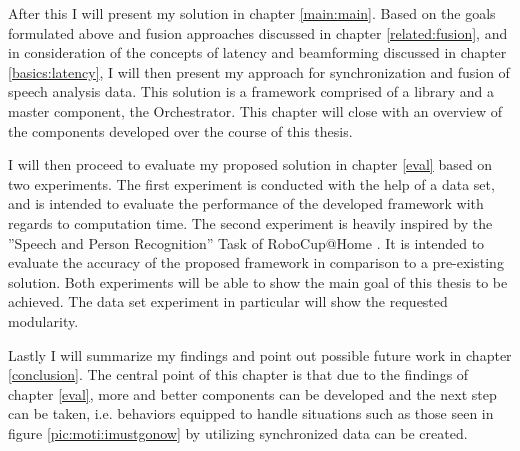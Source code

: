 After this I will present my solution in chapter \ref{main:main}.
Based on the goals formulated above and fusion approaches discussed in chapter \ref{related:fusion}, and in consideration of the concepts of latency and beamforming discussed in chapter \ref{basics:latency}, I will then present my approach for synchronization and fusion of speech analysis data.
This solution is a framework comprised of a library and a master component, the Orchestrator.
This chapter will close with an overview of the components developed over the course of this thesis.

I will then proceed to evaluate my proposed solution in chapter \ref{eval} based on two experiments.
The first experiment is conducted with the help of a data set, and is intended to evaluate the performance of the developed framework with regards to computation time.
The second experiment is heavily inspired by the ''Speech and Person Recognition'' Task of RoboCup@Home \cite{rulebook_2018}.
It is intended to evaluate the accuracy of the proposed framework in comparison to a pre-existing solution.
Both experiments will be able to show the main goal of this thesis to be achieved.
The data set experiment in particular will show the requested modularity.

Lastly I will summarize my findings and point out possible future work in chapter \ref{conclusion}.
The central point of this chapter is that due to the findings of chapter \ref{eval}, more and better components can be developed and the next step can be taken, i.e. behaviors equipped to handle situations such as those seen in figure \ref{pic:moti:imustgonow} by utilizing synchronized data can be created.

